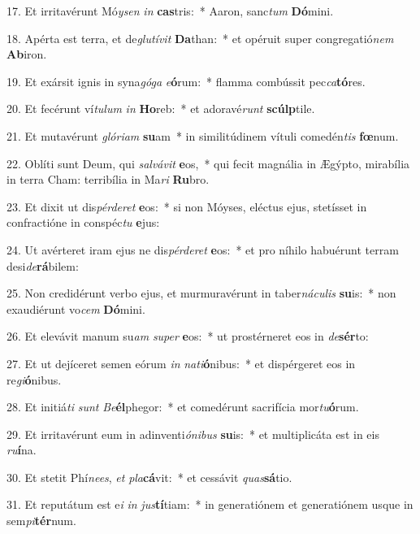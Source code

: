 17. Et irritavérunt Mó\textit{y}\textit{sen} \textit{in} \textbf{cas}tris:~*  Aaron, sanc\textit{tum} \textbf{Dó}mini.\

18. Apérta est terra, et de\textit{glu}\textit{tí}\textit{vit} \textbf{Da}than:~*  et opéruit super congregatió\textit{nem} \textbf{Ab}iron.\

19. Et exársit ignis in syna\textit{gó}\textit{ga} \textit{e}\textbf{ó}rum:~*  flamma combússit pec\textit{ca}\textbf{tó}res.\

20. Et fecérunt ví\textit{tu}\textit{lum} \textit{in} \textbf{Ho}reb:~*  et adoravé\textit{runt} \textbf{scúlp}tile.\

21. Et mutavérunt \textit{gló}\textit{ri}\textit{am} \textbf{su}am~*  in similitúdinem vítuli comedén\textit{tis} \textbf{fœ}num.\

22. Oblíti sunt Deum, qui \textit{sal}\textit{vá}\textit{vit} \textbf{e}os,~*  qui fecit magnália in Ægýpto, mirabília in terra Cham: terribília in Ma\textit{ri} \textbf{Ru}bro.\

23. Et dixit ut dis\textit{pér}\textit{de}\textit{ret} \textbf{e}os:~*  si non Móyses, eléctus ejus, stetísset in confractióne in conspéc\textit{tu} \textbf{e}jus:\

24. Ut avérteret iram ejus ne dis\textit{pér}\textit{de}\textit{ret} \textbf{e}os:~*  et pro níhilo habuérunt terram desi\textit{de}\textbf{rá}bilem:\

25. Non credidérunt verbo ejus, et murmuravérunt in taber\textit{ná}\textit{cu}\textit{lis} \textbf{su}is:~*  non exaudiérunt vo\textit{cem} \textbf{Dó}mini.\

26. Et elevávit manum su\textit{am} \textit{su}\textit{per} \textbf{e}os:~*  ut prostérneret eos in \textit{de}\textbf{sér}to:\

27. Et ut dejíceret semen eórum \textit{in} \textit{na}\textit{ti}\textbf{ó}nibus:~*  et dispérgeret eos in re\textit{gi}\textbf{ó}nibus.\

28. Et initiá\textit{ti} \textit{sunt} \textit{Be}\textbf{él}phegor:~*  et comedérunt sacrifícia mor\textit{tu}\textbf{ó}rum.\

29. Et irritavérunt eum in adinventi\textit{ó}\textit{ni}\textit{bus} \textbf{su}is:~*  et multiplicáta est in eis \textit{ru}\textbf{í}na.\

30. Et stetit Phí\textit{nees}, \textit{et} \textit{pla}\textbf{cá}vit:~*  et cessávit \textit{quas}\textbf{sá}tio.\

31. Et reputátum est e\textit{i} \textit{in} \textit{jus}\textbf{tí}tiam:~*  in generatiónem et generatiónem usque in sem\textit{pi}\textbf{tér}num.\

